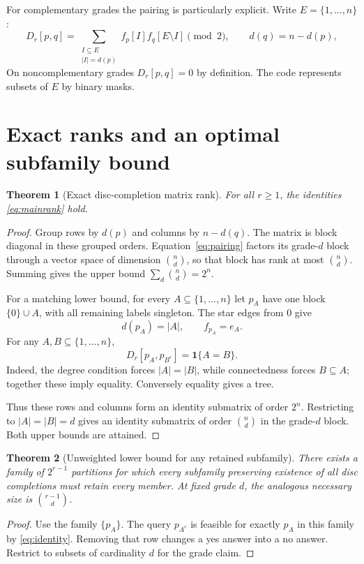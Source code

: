 \documentclass[11pt,a4paper]{article}
\newtheorem{theorem}{Theorem}[section]
\theoremstyle{remark}\newtheorem{remark}[theorem]{Remark}
\newcommand{\one}{\mathbf 1}
\begin{document}
For complementary grades the pairing is particularly explicit. Write $E=\{1,\ldots,n\}$:
\begin{equation}\label{eq:pairing}
 D_r[p,q]=\sum_{\substack{I\subseteq E\\ |I|=d(p)}}
       f_p[I]f_q[E\setminus I]\pmod2,
 \qquad d(q)=n-d(p),
\end{equation}
On noncomplementary grades $D_r[p,q]=0$ by definition. The code represents subsets of $E$ by binary masks.

\section{Exact ranks and an optimal subfamily bound}\label{sec:rank}
\begin{theorem}[Exact disc-completion matrix rank]\label{thm:rank}
For all $r\ge1$, the identities \eqref{eq:mainrank} hold.
\end{theorem}
\begin{proof}
Group rows by $d(p)$ and columns by $n-d(q)$. The matrix is block diagonal in these grouped orders. Equation~\eqref{eq:pairing} factors its grade-$d$ block through a vector space of dimension $\binom nd$, so that block has rank at most $\binom nd$. Summing gives the upper bound $\sum_d\binom nd=2^n$.

For a matching lower bound, for every $A\subseteq\{1,\ldots,n\}$ let $p_A$ have one block $\{0\}\cup A$, with all remaining labels singleton. The star edges from $0$ give
\[
 d(p_A)=|A|,\qquad f_{p_A}=e_A.
\]
For any $A,B\subseteq\{1,\ldots,n\}$,
\begin{equation}\label{eq:identity}
 D_r[p_A,p_{B^c}]=\one\{A=B\}.
\end{equation}
Indeed, the degree condition forces $|A|=|B|$, while connectedness forces $B\subseteq A$; together these imply equality. Conversely equality gives a tree.

Thus these rows and columns form an identity submatrix of order $2^n$. Restricting to $|A|=|B|=d$ gives an identity submatrix of order $\binom nd$ in the grade-$d$ block. Both upper bounds are attained.
\end{proof}

\begin{theorem}[Unweighted lower bound for any retained subfamily]\label{thm:lower}
There exists a family of $2^{r-1}$ partitions for which every subfamily preserving existence of all disc completions must retain every member. At fixed grade $d$, the analogous necessary size is $\binom{r-1}{d}$.
\end{theorem}
\begin{proof}
Use the family $\{p_A\}$. The query $p_{A^c}$ is feasible for exactly $p_A$ in this family by \eqref{eq:identity}. Removing that row changes a yes answer into a no answer. Restrict to subsets of cardinality $d$ for the grade claim.
\end{proof}
\end{document}
